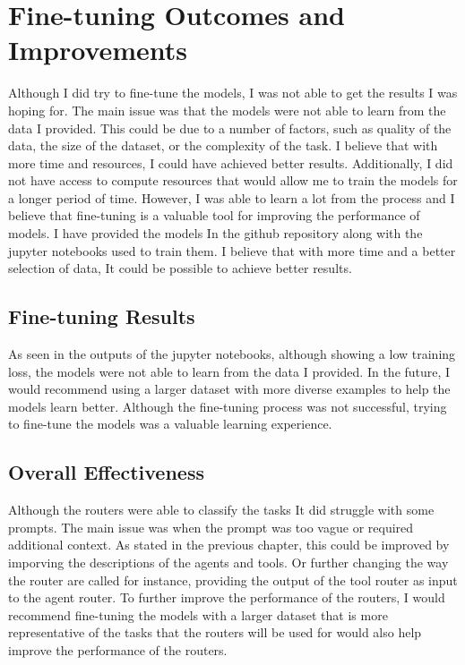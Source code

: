 \section{Fine-tuning Outcomes and Improvements}
\label{sec:results-fine-tuning}

Although I did try to fine-tune the models, I was not able to get the results I was hoping for. The main issue was that the models were not able to learn from the data I provided. This could be due to a number of factors, such as quality of the data, the size of the dataset, or the complexity of the task. I believe that with more time and resources, I could have achieved better results. Additionally, I did not have access to compute resources that would allow me to train the models for a longer period of time. However, I was able to learn a lot from the process and I believe that fine-tuning is a valuable tool for improving the performance of models. I have provided the models In the github repository along with the jupyter notebooks used to train them. I believe that with more time and a better selection of data, It could be possible to achieve better results.

\subsection{Fine-tuning Results}
\label{sec:results-fine-tuning-results}


As seen in the outputs of the jupyter notebooks, although showing a low training loss, the models were not able to learn from the data I provided. In the future, I would recommend using a larger dataset with more diverse examples to help the models learn better. Although the fine-tuning process was not successful, trying to fine-tune the models was a valuable learning experience.


\subsection{Overall Effectiveness}
\label{sec:results-effectiveness}

Although the routers were able to classify the tasks It did struggle with some prompts. The main issue was when the prompt was too vague or required additional context. As stated in the previous chapter, this could be improved by imporving the descriptions of the agents and tools. Or further changing the way the router are called for instance, providing the output of the tool router as input to the agent router. To further improve the performance of the routers, I would recommend fine-tuning the models with a larger dataset that is more representative of the tasks that the routers will be used for would also help improve the performance of the routers.



